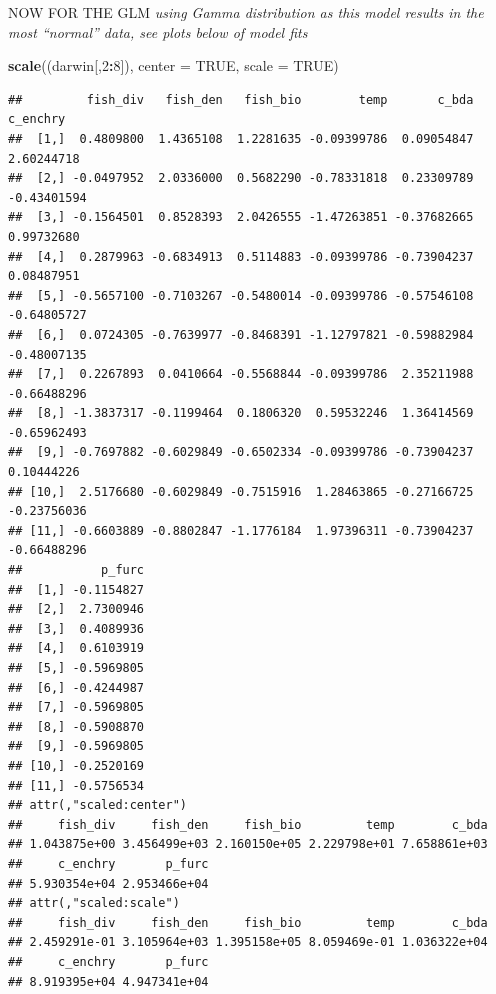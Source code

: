 \documentclass[]{article}
\newenvironment{Shaded}{\begin{snugshade}}{\end{snugshade}}
\newcommand{\KeywordTok}[1]{\textcolor[rgb]{0.13,0.29,0.53}{\textbf{#1}}}
\newcommand{\DataTypeTok}[1]{\textcolor[rgb]{0.13,0.29,0.53}{#1}}
\newcommand{\DecValTok}[1]{\textcolor[rgb]{0.00,0.00,0.81}{#1}}
\newcommand{\OtherTok}[1]{\textcolor[rgb]{0.56,0.35,0.01}{#1}}
\newcommand{\OperatorTok}[1]{\textcolor[rgb]{0.81,0.36,0.00}{\textbf{#1}}}
\newcommand{\NormalTok}[1]{#1}
\begin{document}
NOW FOR THE GLM \emph{using Gamma distribution as this model results in
the most ``normal'' data, see plots below of model fits}

\begin{Shaded}
\begin{Highlighting}[]
\KeywordTok{scale}\NormalTok{((darwin[,}\DecValTok{2}\OperatorTok{:}\DecValTok{8}\NormalTok{]), }\DataTypeTok{center =} \OtherTok{TRUE}\NormalTok{, }\DataTypeTok{scale =} \OtherTok{TRUE}\NormalTok{)}
\end{Highlighting}
\end{Shaded}

\begin{verbatim}
##         fish_div   fish_den   fish_bio        temp       c_bda    c_enchry
##  [1,]  0.4809800  1.4365108  1.2281635 -0.09399786  0.09054847  2.60244718
##  [2,] -0.0497952  2.0336000  0.5682290 -0.78331818  0.23309789 -0.43401594
##  [3,] -0.1564501  0.8528393  2.0426555 -1.47263851 -0.37682665  0.99732680
##  [4,]  0.2879963 -0.6834913  0.5114883 -0.09399786 -0.73904237  0.08487951
##  [5,] -0.5657100 -0.7103267 -0.5480014 -0.09399786 -0.57546108 -0.64805727
##  [6,]  0.0724305 -0.7639977 -0.8468391 -1.12797821 -0.59882984 -0.48007135
##  [7,]  0.2267893  0.0410664 -0.5568844 -0.09399786  2.35211988 -0.66488296
##  [8,] -1.3837317 -0.1199464  0.1806320  0.59532246  1.36414569 -0.65962493
##  [9,] -0.7697882 -0.6029849 -0.6502334 -0.09399786 -0.73904237  0.10444226
## [10,]  2.5176680 -0.6029849 -0.7515916  1.28463865 -0.27166725 -0.23756036
## [11,] -0.6603889 -0.8802847 -1.1776184  1.97396311 -0.73904237 -0.66488296
##           p_furc
##  [1,] -0.1154827
##  [2,]  2.7300946
##  [3,]  0.4089936
##  [4,]  0.6103919
##  [5,] -0.5969805
##  [6,] -0.4244987
##  [7,] -0.5969805
##  [8,] -0.5908870
##  [9,] -0.5969805
## [10,] -0.2520169
## [11,] -0.5756534
## attr(,"scaled:center")
##     fish_div     fish_den     fish_bio         temp        c_bda 
## 1.043875e+00 3.456499e+03 2.160150e+05 2.229798e+01 7.658861e+03 
##     c_enchry       p_furc 
## 5.930354e+04 2.953466e+04 
## attr(,"scaled:scale")
##     fish_div     fish_den     fish_bio         temp        c_bda 
## 2.459291e-01 3.105964e+03 1.395158e+05 8.059469e-01 1.036322e+04 
##     c_enchry       p_furc 
## 8.919395e+04 4.947341e+04
\end{verbatim}
\end{document}
